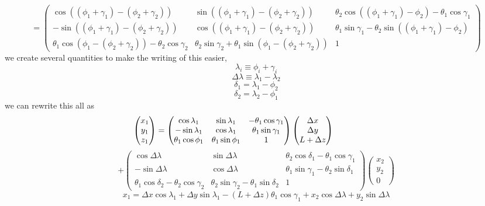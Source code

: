 \documentclass[11pt]{amsart}
\makeatletter
\newcommand{\msp}[1]{\mspace{#1mu}}		%
\newcommand{\0}{\varnothing}		%
\newcommand{\eq}{\equiv}		%
\newcommand{\1}{!}
\newcommand{\2}{@}
\newcommand{\3}{\#}
\newcommand{\4}{\$}
\newcommand{\5}{\%}
\newcommand{\6}{$^\wedge$}
\newcommand{\7}{\&}
\newcommand{\8}{*}
\newcommand{\9}{(}
\makeatother
\begin{document}
\[
=\begin{pmatrix}
\cos\left(\left(\phi_1+\gamma_1\right)-\left(\phi_2+\gamma_2\right)\right)	&	\sin\left(\left(\phi_1+\gamma_1\right)-\left(\phi_2+\gamma_2\right)\right) & \theta_2\cos\left(\left(\phi_1+\gamma_1\right)-\phi_2\right) - \theta_1\cos \gamma_1
\\
-\sin\left(\left(\phi_1+\gamma_1\right)-\left(\phi_2+\gamma_2\right)\right)	&	\cos\left(\left(\phi_1+\gamma_1\right)-\left(\phi_2+\gamma_2\right)\right)	&	\theta_1\sin\gamma_1-\theta_2\sin\left(\left(\phi_1+\gamma_1\right)-\phi_2\right)
\\
\theta_1\cos\left(\phi_1-\left(\phi_2+\gamma_2\right)\right)-\theta_2\cos \gamma_2	&	\theta_2\sin\gamma_2+\theta_1\sin\left(\phi_1-\left(\phi_2+\gamma_2\right)\right)	&	1
\end{pmatrix}
\]
we create several quantities to make the writing of this easier,
\[
\lambda_i \eq \phi_i+\gamma_i
\]
\[
\Delta \lambda \eq \lambda_1-\lambda_2
\]
\[
\delta_1 = \lambda_1-\phi_2
\]
\[
\delta_2 = \lambda_2-\phi_1
\]
we can rewrite this all as
\[
\msp{-100}
\begin{pmatrix}
x_1 
\\
y_1
\\
z_1
\end{pmatrix}
= 
\begin{pmatrix}
\cos\lambda_1 & \sin \lambda_1 & -\theta_1\cos\gamma_1
\\
-\sin\lambda_1 & \cos\lambda_1 & \theta_1\sin \gamma_1
\\
\theta_1\cos \phi_1 & \theta_1\sin\phi_1	&	1
\end{pmatrix}
\begin{pmatrix}
\Delta x
\\
\Delta y
\\
L+\Delta z
\end{pmatrix}
\]\[+
\begin{pmatrix}
\cos \Delta \lambda	&	\sin \Delta \lambda	&	\theta_2\cos\delta_1-\theta_1\cos\gamma_1
\\
-\sin \Delta \lambda 	&	\cos \Delta \lambda	&	\theta_1\sin\gamma_1-\theta_2\sin\delta_1
\\
\theta_1\cos\delta_2-\theta_2\cos\gamma_2	&	\theta_2\sin\gamma_2-\theta_1\sin\delta_2	&	1
\end{pmatrix}
\begin{pmatrix}
x_2
\\
y_2
\\
0
\end{pmatrix}
\]
\[
x_1= \Delta x\cos\lambda_1+\Delta y \sin\lambda_1-(L+\Delta z)\theta_1\cos\gamma_1+x_2\cos \Delta \lambda +y_2\sin\Delta \lambda
\]
\end{document}
